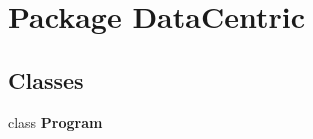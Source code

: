 \hypertarget{namespace_data_centric}{\section{Package Data\-Centric}
\label{namespace_data_centric}
}
\subsection*{Classes}
\begin{DoxyCompactItemize}
\item 
class {\bfseries Program}
\end{DoxyCompactItemize}
